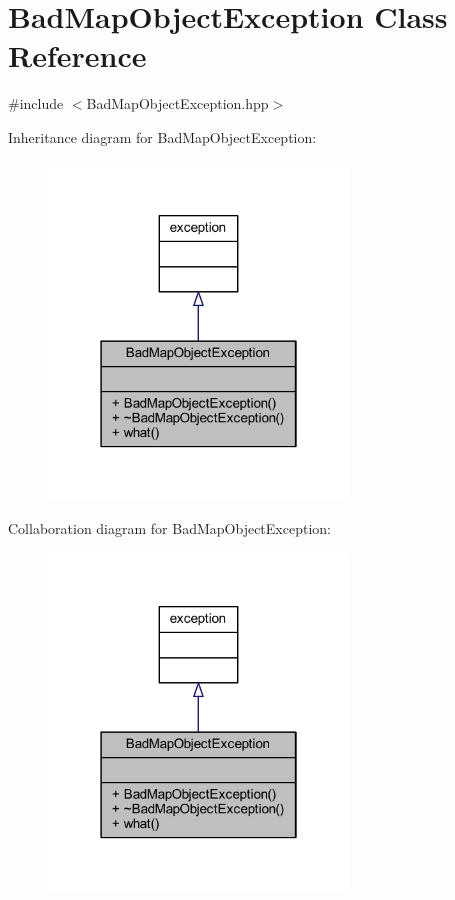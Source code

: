 \hypertarget{class_bad_map_object_exception}{}\section{Bad\+Map\+Object\+Exception Class Reference}
\label{class_bad_map_object_exception}


{\ttfamily \#include $<$Bad\+Map\+Object\+Exception.\+hpp$>$}



Inheritance diagram for Bad\+Map\+Object\+Exception\+:\nopagebreak
\begin{figure}[H]
\begin{center}
\leavevmode
\includegraphics[width=226pt]{class_bad_map_object_exception__inherit__graph}
\end{center}
\end{figure}


Collaboration diagram for Bad\+Map\+Object\+Exception\+:\nopagebreak
\begin{figure}[H]
\begin{center}
\leavevmode
\includegraphics[width=226pt]{class_bad_map_object_exception__coll__graph}
\end{center}
\end{figure}
